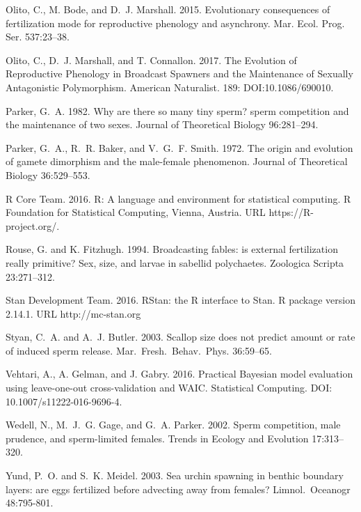 \documentclass{article}
\begin{document}
\begin{thebibliography}{}
Olito, C., M. Bode, and D.~J. Marshall. 2015.
\newblock Evolutionary consequences of fertilization mode for reproductive phenology and asynchrony.
\newblock Mar. Ecol. Prog. Ser. 537:23--38.

Olito, C., D.~J. Marshall, and T. Connallon. 2017.
\newblock The Evolution of Reproductive Phenology in Broadcast Spawners and the Maintenance of Sexually Antagonistic Polymorphism.
\newblock American Naturalist. 189: DOI:10.1086/690010.

Parker, G.~A. 1982.
\newblock Why are there so many tiny sperm? sperm competition and the maintenance of two sexes.
\newblock Journal of Theoretical Biology 96:281--294.

Parker, G.~A., R.~R. Baker, and V.~G.~F. Smith. 1972.
\newblock The origin and evolution of gamete dimorphism and the male-female phenomenon.
\newblock Journal of Theoretical Biology 36:529--553.

R Core Team. 2016.
\newblock R: A language and environment for statistical computing. 
\newblock R Foundation for Statistical Computing, Vienna, Austria. URL https://R-project.org/.

Rouse, G. and K. Fitzhugh. 1994.
\newblock Broadcasting fables: is external fertilization really primitive? Sex, size, and larvae in sabellid polychaetes.
\newblock Zoologica Scripta 23:271--312.

Stan Development Team. 2016.
\newblock RStan: the R interface to Stan.
\newblock R package version 2.14.1. URL http://mc-stan.org

Styan, C.~A. and A.~J. Butler. 2003.
\newblock Scallop size does not predict amount or rate of induced sperm release.
\newblock Mar.~Fresh.~Behav.~Phys. 36:59--65.

Vehtari, A., A. Gelman, and J. Gabry. 2016.
\newblock Practical Bayesian model evaluation using leave-one-out cross-validation and WAIC.
\newblock Statistical Computing. DOI: 10.1007/s11222-016-9696-4.

Wedell, N., M.~J.~G. Gage, and G.~A. Parker. 2002.
\newblock Sperm competition, male prudence, and sperm-limited females.
\newblock Trends in Ecology and Evolution 17:313--320.

Yund, P.~O. and S.~K. Meidel. 2003.
\newblock Sea urchin spawning in benthic boundary layers: are eggs fertilized before advecting away from females?
\newblock Limnol.~Oceanogr 48:795-801.

\end{thebibliography}

\newpage{}
\end{document}

